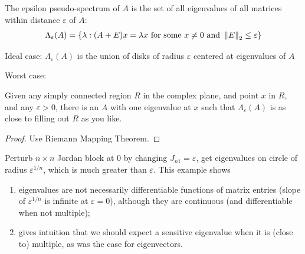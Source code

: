 \documentclass[11pt]{article}
\numberwithin{equation}{section}
\begin{document}
\begin{definition}
    The epsilon pseudo-spectrum of $A$ is the set of all eigenvalues of all matrices within distance $\varepsilon$ of $A$:\begin{align*}
        \Lambda_{\varepsilon}(A) = \left\{ \lambda: (A+E)x=\lambda x \text{ for some }x\neq 0 \text{ and }\left\| E \right\|_2 \leq \varepsilon \right\}
    \end{align*}
\end{definition}

Ideal case: $\Lambda_{\varepsilon}(A)$ is the union of disks of radius $\varepsilon$ centered at eigenvalues of $A$

Worst case: 
\begin{theorem}
    Given any simply connected region $R$ in the complex plane, and point $x$ in $R$, and any $\varepsilon > 0$, 
    there is an $A$ with one eigenvalue at $x$ such that $\Lambda_{\varepsilon}(A)$ is as close to filling out $R$ as you like. 
    \begin{proof}
        Use Riemann Mapping Theorem.
    \end{proof}
\end{theorem}

\begin{example}
    Perturb $n\times n$ Jordan block at $0$ by changing $J_{n1} = \varepsilon$, get eigenvalues on circle of radius $\varepsilon^{1/n}$,
    which is much greater than $\varepsilon$. This example shows \begin{enumerate}
        \item eigenvalues are not necessarily differentiable functions of matrix entries (slope of $\varepsilon^{1/n}$ is infinite at $\varepsilon=0$), 
        although they are continuous (and differentiable when not multiple);
       \item gives intuition that we should expect a sensitive eigenvalue when it is (close to) multiple, as was the case for eigenvectors.
    \end{enumerate}
\end{example}
\end{document}
